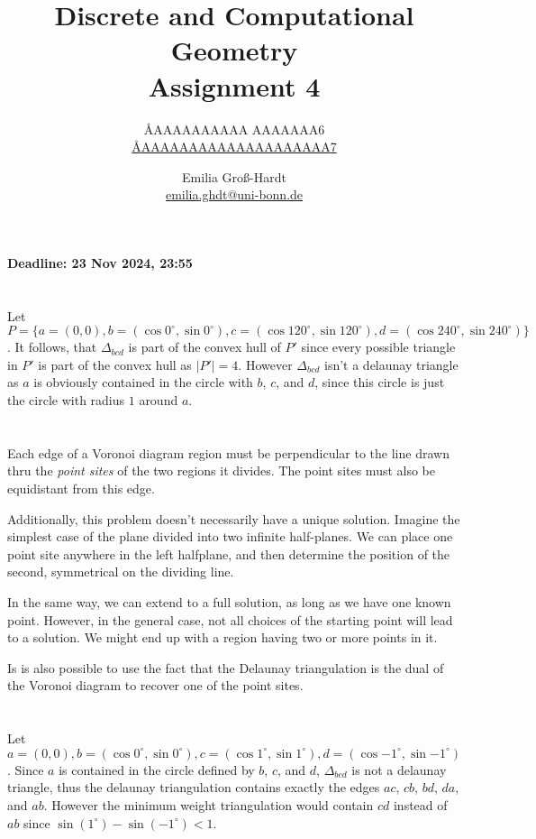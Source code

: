 \documentclass{article}
\title{Discrete and Computational Geometry \\ Assignment 4}
\author{
  \AA{AAAAAAAAAA AAAAAAA}{6} \\
  \href{mailto:\AA{AAAAAAAAAAAAAAAAAAAA}{7}}{\AA{AAAAAAAAAAAAAAAAAAAA}{7}}
  \and
  Emilia Groß-Hardt \\
  \href{mailto:emilia.ghdt@uni-bonn.de}{emilia.ghdt@uni-bonn.de}
}
\begin{document}
  \maketitle
  \begin{center}
    { \bfseries Deadline: 23 Nov 2024, 23:55 }
  \end{center}

  \section{}
  Let $P = \{a=(0, 0), b=(\cos{0^\circ, \sin{0^\circ}}), c=(\cos{120^\circ, \sin{120^\circ}}), d=(\cos{240^\circ, \sin{240^\circ}})\}$. It follows, that $\Delta_{bcd}$ is part of the convex hull of $P'$ since every possible triangle in $P'$ is part of the convex hull as $|P'| = 4$. However $\Delta_{bcd}$ isn't a delaunay triangle as $a$ is obviously contained in the circle with $b$, $c$, and $d$, since this circle is just the circle with radius $1$ around $a$.
  
  \section{}
  Each edge of a Voronoi diagram region must be perpendicular to the line drawn thru the \textit{point sites} of the two regions it divides. The point sites must also be equidistant from this edge.

  Additionally, this problem doesn't necessarily have a unique solution. Imagine the simplest case of the plane divided into two infinite half-planes. We can place one point site anywhere in the left halfplane, and then determine the position of the second, symmetrical on the dividing line. 

  In the same way, we can extend to a full solution, as long as we have one known point.
  However, in the general case, not all choices of the starting point will lead to a solution. We might end up with a region having two or more points in it. 

  Is is also possible to use the fact that the Delaunay triangulation is the dual of the Voronoi diagram to recover one of the point sites.
  
  \section{}
  Let $a = (0, 0), b = (\cos{0^\circ, \sin{0^\circ}}), c = (\cos{1^\circ, \sin{1^\circ}}), d = (\cos{-1^\circ, \sin{-1^\circ}})$.
  Since $a$ is contained in the circle defined by $b$, $c$, and $d$, $\Delta_{bcd}$ is not a delaunay triangle, thus the delaunay triangulation contains exactly the edges $ac$, $cb$, $bd$, $da$, and $ab$. However the minimum weight triangulation would contain $cd$ instead of $ab$ since $\sin{(1^\circ)} - \sin{(-1^\circ)} < 1$.
\end{document}
